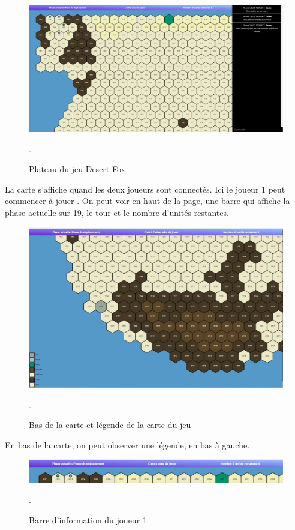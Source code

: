 \begin{figure}[H]
\centering
\includegraphics[scale=0.35]{data/plateau_du_jeu.jpg}
\caption{Plateau du jeu Desert Fox}.
\end{figure}

La carte s'affiche quand les deux joueurs sont connectés. Ici le joueur 1 peut commencer à jouer
. On peut voir en haut de la page, une barre qui affiche la phase actuelle sur 19, le tour  et le nombre d'unités restantes.


\begin{figure}[H]
\centering
\includegraphics[scale=0.35]{data/justification2.jpg}
\caption{Bas de la carte et légende de la carte du jeu}.
\end{figure}
En bas de la carte, on peut observer une légende, en bas à gauche.\\
\begin{figure}[H]
\centering
\includegraphics[scale=0.4]{data/player_1_acces.jpg}
\caption{Barre d'information du joueur 1}.
\end{figure}

